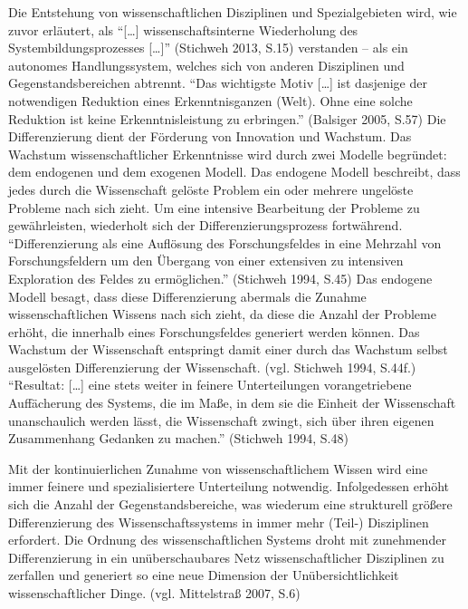 \documentclass[a4paper,
fontsize=11pt,
oneside,
numbers=noperiodatend,
parskip=half-,
bibliography=totoc,
final
]{scrartcl}
\begin{document}
Die Entstehung von wissenschaftlichen Disziplinen und Spezialgebieten
wird, wie zuvor erläutert, als \enquote{{[}\ldots{}{]}
wissenschaftsinterne Wiederholung des Systembildungsprozesses
{[}\ldots{}{]}} (Stichweh 2013, S.15) verstanden -- als ein autonomes
Handlungssystem, welches sich von anderen Disziplinen und
Gegenstandsbereichen abtrennt. \enquote{Das wichtigste Motiv
{[}\ldots{}{]} ist dasjenige der notwendigen Reduktion eines
Erkenntnisganzen (Welt). Ohne eine solche Reduktion ist keine
Erkenntnisleistung zu erbringen.} (Balsiger 2005, S.57) Die
Differenzierung dient der Förderung von Innovation und Wachstum. Das
Wachstum wissenschaftlicher Erkenntnisse wird durch zwei Modelle
begründet: dem endogenen und dem exogenen Modell. Das endogene Modell
beschreibt, dass jedes durch die Wissenschaft gelöste Problem ein oder
mehrere ungelöste Probleme nach sich zieht. Um eine intensive
Bearbeitung der Probleme zu gewährleisten, wiederholt sich der
Differenzierungsprozess fortwährend. \enquote{Differenzierung als eine
Auflösung des Forschungsfeldes in eine Mehrzahl von Forschungsfeldern um
den Übergang von einer extensiven zu intensiven Exploration des Feldes
zu ermöglichen.} (Stichweh 1994, S.45) Das endogene Modell besagt, dass
diese Differenzierung abermals die Zunahme wissenschaftlichen Wissens
nach sich zieht, da diese die Anzahl der Probleme erhöht, die innerhalb
eines Forschungsfeldes generiert werden können. Das Wachstum der
Wissenschaft entspringt damit einer durch das Wachstum selbst
ausgelösten Differenzierung der Wissenschaft. (vgl. Stichweh 1994,
S.44f.) \enquote{Resultat: {[}\ldots{}{]} eine stets weiter in feinere
Unterteilungen vorangetriebene Auffächerung des Systems, die im Maße, in
dem sie die Einheit der Wissenschaft unanschaulich werden lässt, die
Wissenschaft zwingt, sich über ihren eigenen Zusammenhang Gedanken zu
machen.} (Stichweh 1994, S.48)

Mit der kontinuierlichen Zunahme von wissenschaftlichem Wissen wird eine
immer feinere und spezialisiertere Unterteilung notwendig. Infolgedessen
erhöht sich die Anzahl der Gegenstandsbereiche, was wiederum eine
strukturell größere Differenzierung des Wissenschaftssystems in immer
mehr (Teil-) Disziplinen erfordert. Die Ordnung des wissenschaftlichen
Systems droht mit zunehmender Differenzierung in ein unüberschaubares
Netz wissenschaftlicher Disziplinen zu zerfallen und generiert so eine
neue Dimension der Unübersichtlichkeit wissenschaftlicher Dinge. (vgl.
Mittelstraß 2007, S.6)
\end{document}
